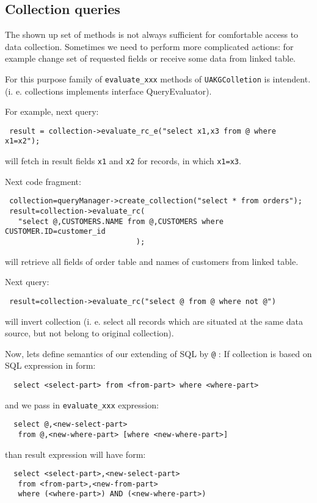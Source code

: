 \subsection{ Collection queries }

 The shown up set of methods is not always  sufficient for comfortable access to data collection.
Sometimes we need to perform more complicated actions:
for example change set of requested fields or receive some data from
linked table.

 For this purpose family of \verb|evaluate_xxx| methods of \verb|UAKGColletion| is intendent. (i. e. collections implements interface QueryEvaluator).

 For example, next query:
\begin{verbatim}
 result = collection->evaluate_rc_e("select x1,x3 from @ where x1=x2");
\end{verbatim}
 will fetch in result fields \verb|x1| and \verb|x2| for records, in which \verb|x1=x3|.

Next code fragment:
\begin{verbatim}
 collection=queryManager->create_collection("select * from orders");
 result=collection->evaluate_rc( 
   "select @,CUSTOMERS.NAME from @,CUSTOMERS where CUSTOMER.ID=customer_id
                              );
\end{verbatim}
 will retrieve all fields of order table and names of customers from linked table.  

Next query:
\begin{verbatim}
 result=collection->evaluate_rc("select @ from @ where not @")
\end{verbatim}
 will invert collection (i. e. select all records which are situated at the
same data source, but not belong to original collection).

Now, lets define semantics of our extending of SQL by \verb|@| :
\newline
If collection is based on SQL expression in form:
\begin{verbatim}
  select <select-part> from <from-part> where <where-part>
\end{verbatim}
and we pass in \verb|evaluate_xxx|  expression:
\begin{verbatim}
  select @,<new-select-part>
   from @,<new-where-part> [where <new-where-part>]
\end{verbatim}
 than result expression will have form:
\begin{verbatim}
  select <select-part>,<new-select-part>
   from <from-part>,<new-from-part>
   where (<where-part>) AND (<new-where-part>)
\end{verbatim}

